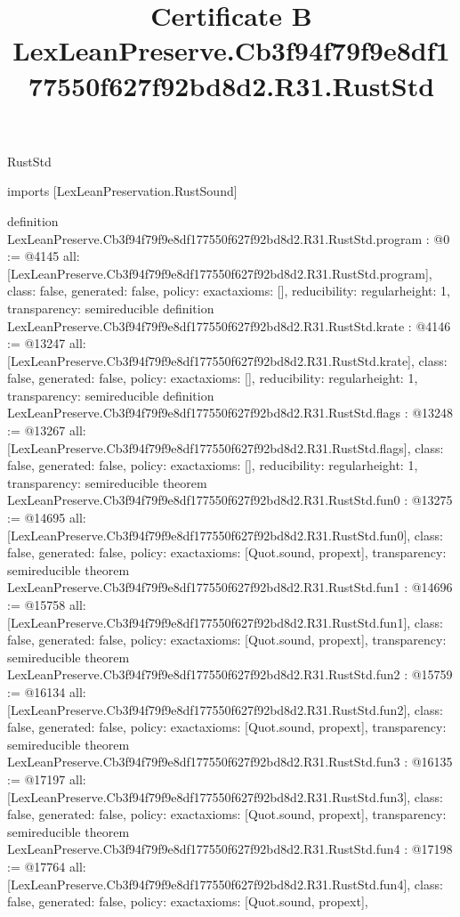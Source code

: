 \begin{lexlean}{RustStd}
\title{Certificate B LexLeanPreserve.Cb3f94f79f9e8df177550f627f92bd8d2.R31.RustStd}
\begin{coremodule}
imports [LexLeanPreservation.RustSound]

definition LexLeanPreserve.Cb3f94f79f9e8df177550f627f92bd8d2.R31.RustStd.program : @0 := @4145 {
  all: [LexLeanPreserve.Cb3f94f79f9e8df177550f627f92bd8d2.R31.RustStd.program],
  class: false,
  generated: false,
  policy: exact{axioms: []},
  reducibility: regular{height: 1},
  transparency: semireducible
}
definition LexLeanPreserve.Cb3f94f79f9e8df177550f627f92bd8d2.R31.RustStd.krate : @4146 := @13247 {
  all: [LexLeanPreserve.Cb3f94f79f9e8df177550f627f92bd8d2.R31.RustStd.krate],
  class: false,
  generated: false,
  policy: exact{axioms: []},
  reducibility: regular{height: 1},
  transparency: semireducible
}
definition LexLeanPreserve.Cb3f94f79f9e8df177550f627f92bd8d2.R31.RustStd.flags : @13248 := @13267 {
  all: [LexLeanPreserve.Cb3f94f79f9e8df177550f627f92bd8d2.R31.RustStd.flags],
  class: false,
  generated: false,
  policy: exact{axioms: []},
  reducibility: regular{height: 1},
  transparency: semireducible
}
theorem LexLeanPreserve.Cb3f94f79f9e8df177550f627f92bd8d2.R31.RustStd.fun0 : @13275 := @14695 {
  all: [LexLeanPreserve.Cb3f94f79f9e8df177550f627f92bd8d2.R31.RustStd.fun0],
  class: false,
  generated: false,
  policy: exact{axioms: [Quot.sound, propext]},
  transparency: semireducible
}
theorem LexLeanPreserve.Cb3f94f79f9e8df177550f627f92bd8d2.R31.RustStd.fun1 : @14696 := @15758 {
  all: [LexLeanPreserve.Cb3f94f79f9e8df177550f627f92bd8d2.R31.RustStd.fun1],
  class: false,
  generated: false,
  policy: exact{axioms: [Quot.sound, propext]},
  transparency: semireducible
}
theorem LexLeanPreserve.Cb3f94f79f9e8df177550f627f92bd8d2.R31.RustStd.fun2 : @15759 := @16134 {
  all: [LexLeanPreserve.Cb3f94f79f9e8df177550f627f92bd8d2.R31.RustStd.fun2],
  class: false,
  generated: false,
  policy: exact{axioms: [Quot.sound, propext]},
  transparency: semireducible
}
theorem LexLeanPreserve.Cb3f94f79f9e8df177550f627f92bd8d2.R31.RustStd.fun3 : @16135 := @17197 {
  all: [LexLeanPreserve.Cb3f94f79f9e8df177550f627f92bd8d2.R31.RustStd.fun3],
  class: false,
  generated: false,
  policy: exact{axioms: [Quot.sound, propext]},
  transparency: semireducible
}
theorem LexLeanPreserve.Cb3f94f79f9e8df177550f627f92bd8d2.R31.RustStd.fun4 : @17198 := @17764 {
  all: [LexLeanPreserve.Cb3f94f79f9e8df177550f627f92bd8d2.R31.RustStd.fun4],
  class: false,
  generated: false,
  policy: exact{axioms: [Quot.sound, propext]},
}
\end{coremodule}
\end{lexlean}
